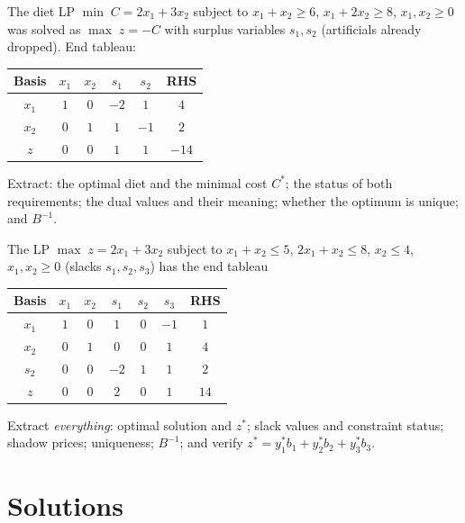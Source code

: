 \begin{problems}
  \item The diet LP $\min\; C=2x_{1}+3x_{2}$ subject to $x_{1}+x_{2}\ge 6$,
        $x_{1}+2x_{2}\ge 8$, $x_{1},x_{2}\ge 0$ was solved as
        $\max\; z=-C$ with surplus variables $s_{1},s_{2}$ (artificials
        already dropped). End tableau:
        \begin{center}
        \begin{tabular}{c|cccc|c}
        Basis & $x_{1}$ & $x_{2}$ & $s_{1}$ & $s_{2}$ & RHS\\
        \hline
        $x_{1}$ & $1$ & $0$ & $-2$ & $1$ & $4$\\
        $x_{2}$ & $0$ & $1$ & $1$ & $-1$ & $2$\\
        \hline
        $z$ & $0$ & $0$ & $1$ & $1$ & $-14$\\
        \end{tabular}
        \end{center}
        Extract: the optimal diet and the minimal cost $C^{*}$; the status
        of both requirements; the dual values and their meaning; whether
        the optimum is unique; and $B^{-1}$.

  \item The LP $\max\; z=2x_{1}+3x_{2}$ subject to $x_{1}+x_{2}\le 5$,
        $2x_{1}+x_{2}\le 8$, $x_{2}\le 4$, $x_{1},x_{2}\ge 0$ (slacks
        $s_{1},s_{2},s_{3}$) has the end tableau
        \begin{center}
        \begin{tabular}{c|ccccc|c}
        Basis & $x_{1}$ & $x_{2}$ & $s_{1}$ & $s_{2}$ & $s_{3}$ & RHS\\
        \hline
        $x_{1}$ & $1$ & $0$ & $1$ & $0$ & $-1$ & $1$\\
        $x_{2}$ & $0$ & $1$ & $0$ & $0$ & $1$ & $4$\\
        $s_{2}$ & $0$ & $0$ & $-2$ & $1$ & $1$ & $2$\\
        \hline
        $z$ & $0$ & $0$ & $2$ & $0$ & $1$ & $14$\\
        \end{tabular}
        \end{center}
        Extract \emph{everything}: optimal solution and $z^{*}$; slack
        values and constraint status; shadow prices; uniqueness; $B^{-1}$;
        and verify $z^{*}=y_{1}^{*}b_{1}+y_{2}^{*}b_{2}+y_{3}^{*}b_{3}$.
\end{problems}

\section{Solutions}

